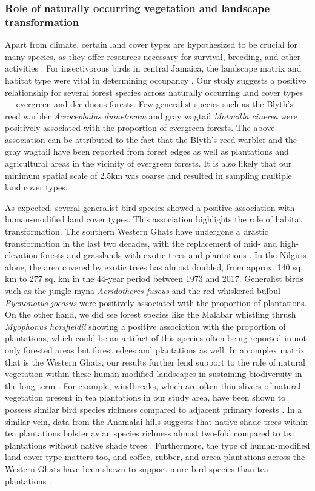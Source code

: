 \subsubsection*{Role of naturally occurring vegetation and landscape transformation}

Apart from climate, certain land cover types are hypothesized to be crucial for many species, as they offer resources necessary for survival, breeding, and other activities \citep{sunarto2012}.
For insectivorous birds in central Jamaica, the landscape matrix and habitat type were vital in determining occupancy \citep{kennedy2011}.
Our study suggests a positive relationship for several forest species across naturally occurring land cover types --- evergreen and deciduous forests.
Few generalist species such as the Blyth's reed warbler \textit{Acrocephalus dumetorum} and gray wagtail \textit{Motacilla cinerea} were positively associated with the proportion of evergreen forests.
The above association can be attributed to the fact that the Blyth's reed warbler and the gray wagtail have been reported from forest edges as well as plantations and agricultural areas in the vicinity of evergreen forests.
It is also likely that our minimum spatial scale of 2.5km was coarse and resulted in sampling multiple land cover types.

As expected, several generalist bird species showed a positive association with human-modified land cover types.
This association highlights the role of habitat transformation.
The southern Western Ghats have undergone a drastic transformation in the last two decades, with the replacement of mid- and high-elevation forests and grasslands with exotic trees and plantations \citep{arasumani2018}.
In the Nilgiris alone, the area covered by exotic trees has almost doubled, from approx.
140 sq. km to 277 sq. km in the 44-year period between 1973 and 2017.
Generalist birds such as the jungle myna \textit{Acridotheres fuscus} and the red-whiskered bulbul \textit{Pycnonotus jocosus} were positively associated with the proportion of plantations.
On the other hand, we did see forest species like the Malabar whistling thrush \textit{Myophonus horsfieldii} showing a positive association with the proportion of plantations, which could be an artifact of this species often being reported in not only forested areas but forest edges and plantations as well.
In a complex matrix that is the Western Ghats, our results further lend support to the role of natural vegetation within these human-modified landscapes in sustaining biodiversity in the long term \citep{anand2010,ranganathan2010}.
For example, windbreaks, which are often thin slivers of natural vegetation present in tea plantations in our study area, have been shown to possess similar bird species richness compared to adjacent primary forests \citep{sreekar2013}.
In a similar vein, data from the Anamalai hills suggests that native shade trees within tea plantations bolster avian species richness almost two-fold compared to tea plantations without native shade trees \citep{raman2021}.
Furthermore, the type of human-modified land cover type matters too, and coffee, rubber, and areca plantations across the Western Ghats have been shown to support more bird species than tea plantations \citep{sidhu2010,karanth2016}.


